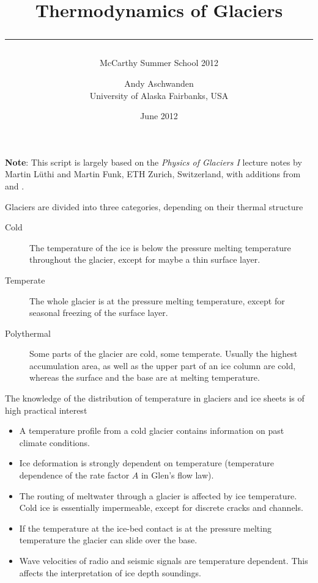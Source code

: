 \documentclass[11pt,a4paper,halfparskip]{scrartcl}
\begin{document}
\title{Thermodynamics of Glaciers\\[.5em]
\rule[1.em]{\textwidth}{2pt}}
\subtitle{McCarthy Summer School 2012}

\date{June 2012}

\author{
  \small Andy Aschwanden\\[-.5em] 
 \small University of Alaska Fairbanks, USA}


\maketitle

{\bf Note}: This script is largely based on the \emph{Physics of Glaciers I} lecture notes by Martin L\"uthi and Martin Funk, ETH Zurich, Switzerland, with additions from \cite{GreveBlatter_disg} and \cite{Gusmeroli2010}.

\vspace{1em}

Glaciers are divided into three categories, depending on their thermal
structure
%
\begin{description}
\item[Cold] The temperature of the ice is below the pressure melting temperature
 throughout the glacier, except for maybe a thin surface layer.
\item[Temperate] The whole glacier is at the pressure melting temperature, except
 for seasonal freezing of the surface layer.
\item[Polythermal] Some parts of the glacier are cold, some temperate.
 Usually the highest accumulation area, as well as the upper part of an ice
 column are cold, whereas the surface and the base are at melting
 temperature.
\end{description}
%
The knowledge of the distribution of temperature in glaciers and ice sheets is
of high practical interest
%
\begin{itemize}\itemsep0ex
\item A temperature profile from a cold glacier contains information on past
 climate conditions.
\item Ice deformation is strongly dependent on temperature (temperature
 dependence of the rate factor $A$ in Glen's flow law).
\item The routing of meltwater through a glacier is affected by ice
 temperature.  Cold ice is essentially impermeable, except for discrete
 cracks and channels.
\item If the temperature at the ice-bed contact is at the pressure melting
 temperature the glacier can slide over the base.
\item Wave velocities of radio and seismic signals are temperature
 dependent. This affects the interpretation of ice depth soundings.
\end{itemize}
\end{document}
